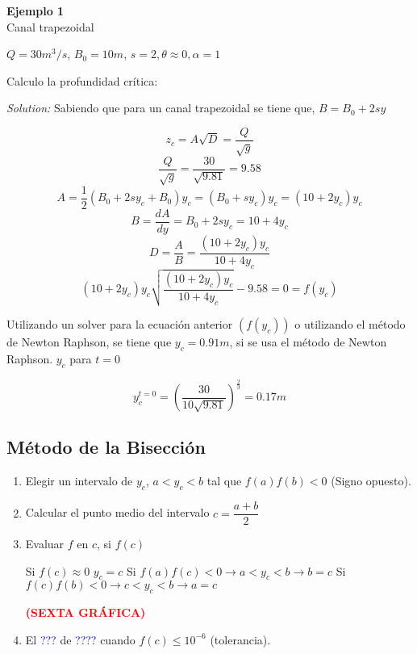 \documentclass[a4paper, 11pt]{article}
\newenvironment{ejemplo}[2][Ejemplo]
    { \begin{mdframed}[backgroundcolor=gray!20] \textbf{#1 #2} \\}
    {  \end{mdframed}}
\newenvironment{solution}
    {\textit{Solution:}}
    {}
\begin{document}
\begin{ejemplo}{1}

Canal trapezoidal

$Q=30m^{3}/s$, $B_{0}=10m$, $s=2, \theta \approx0, \alpha=1$

Calculo la profundidad crítica:

\begin{solution}
    Sabiendo que para un canal trapezoidal se tiene que, $B=B_{0}+2sy$

    $$z_{c}=A\sqrt{D}=\dfrac{Q}{\sqrt{g}}$$
    $$\dfrac{Q}{\sqrt{g}}=\dfrac{30}{\sqrt{9.81}}=9.58$$
    $$A=\dfrac{1}{2}(B_{0}+2sy_{c}+B_{0})y_{c}=(B_{0}+sy_{c})y_{c}=(10+2y_{c})y_{c}$$
    $$B=\dfrac{dA}{dy}=B_{0}+2sy_{c}=10+4y_{c}$$
    $$D=\dfrac{A}{B}=\dfrac{(10+2y_{c})y_{c}}{10+4y_{c}}$$
    $$(10+2y_{c})y_{c}\sqrt{\dfrac{(10+2y_{c})y_{c}}{10+4y_{c}}}-9.58=0=f(y_c)$$

    Utilizando un solver para la ecuación anterior $(f(y_c))$ o utilizando el método de Newton Raphson, se tiene que $y_c=0.91m$, si se usa el método de Newton Raphson. $y_c$ para $t=0$

    $$y^{t=0}_{c}=\left(\dfrac{30}{10\sqrt{9.81}}\right)^\frac{2}{3}=0.17m$$
    
\end{solution}
    
\end{ejemplo}

\subsection{Método de la Bisección}

    \begin{enumerate}
        \item Elegir un intervalo de $y_{c}$, $a<y_{c}<b$ tal que $f(a)f(b)<0$ (Signo opuesto).
        \item Calcular el punto medio del intervalo $c=\dfrac{a+b}{2}$
        \item Evaluar $f$ en $c$, si $f(c)$

        Si $f(c)\approx0$ $y_c=c$
        Si $f(a)f(c)<0\rightarrow a<y_c<b \rightarrow b=c$
        Si $f(c)f(b)<0\rightarrow c<y_c<b \rightarrow a=c$

        \textcolor{red}{\textbf{(SEXTA GRÁFICA)}} \vspace{1ex}

        \item El \textcolor{blue}{???} de \textcolor{blue}{????} cuando $f(c)\leq 10^{-6}$ (tolerancia).
    \end{enumerate}
\end{document}
